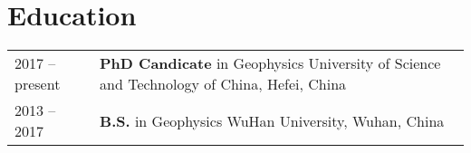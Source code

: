 \section*{Education}
\begin{tabular}{p{} p{}}
2017 -- present & \textbf{PhD Candicate} in Geophysics \newline
       University of Science and Technology of China, Hefei, China \\

2013 -- 2017 & \textbf{B.S.} in Geophysics \newline
       WuHan University, Wuhan, China
\end{tabular}
